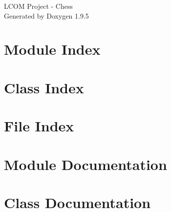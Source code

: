 \documentclass[twoside]{book}
\newcommand{\+}{\discretionary{\mbox{\scriptsize$\hookleftarrow$}}{}{}}
\newcommand{\clearemptydoublepage}{%
    \newpage{\pagestyle{empty}\cleardoublepage}%
  }
\begin{document}
  \raggedbottom
    \hypersetup{pageanchor=false,
                bookmarksnumbered=true,
                pdfencoding=unicode
               }
  \begin{titlepage}
  \vspace*{7cm}
  \begin{center}%
  {\Large LCOM Project -\/ Chess}\\
  \vspace*{1cm}
  {\large Generated by Doxygen 1.9.5}\\
  \end{center}
  \end{titlepage}
  \clearemptydoublepage
  \tableofcontents
  \clearemptydoublepage
  \hypersetup{pageanchor=true}
\chapter{Module Index}

\chapter{Class Index}

\chapter{File Index}

\chapter{Module Documentation}

\chapter{Class Documentation}
















\end{document}
